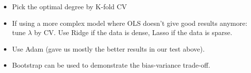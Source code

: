 \documentclass[amssymb,twocolumn,aps,floatfix]{revtex4-2}
\begin{document}
\begin{itemize}
    \item Pick the optimal degree by K-fold CV
    \item If using a more complex model where OLS doesn't give good results anymore: tune $\lambda$ by CV. Use Ridge if the data is dense, Lasso if the data is sparse. 
    \item Use Adam (gave us mostly the better results in our test above). 
    \item Bootstrap can be used to demonstrate the bias-variance trade-off. 
\end{itemize}




\end{document}
